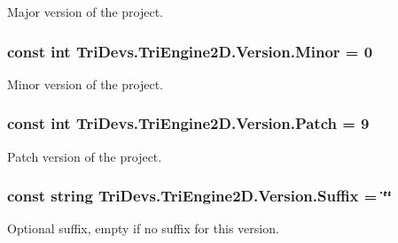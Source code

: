 Major version of the project. 

\hypertarget{class_tri_devs_1_1_tri_engine2_d_1_1_version_a46c99b37d8caad10a9702e9823f6cded}{
\subsubsection[{Minor}]{\setlength{\rightskip}{0pt plus 5cm}const int Tri\-Devs.\-Tri\-Engine2\-D.\-Version.\-Minor = 0}}\label{class_tri_devs_1_1_tri_engine2_d_1_1_version_a46c99b37d8caad10a9702e9823f6cded}


Minor version of the project. 

\hypertarget{class_tri_devs_1_1_tri_engine2_d_1_1_version_a5baa982b0404ea5ed3d2526e26f55809}{
\subsubsection[{Patch}]{\setlength{\rightskip}{0pt plus 5cm}const int Tri\-Devs.\-Tri\-Engine2\-D.\-Version.\-Patch = 9}}\label{class_tri_devs_1_1_tri_engine2_d_1_1_version_a5baa982b0404ea5ed3d2526e26f55809}


Patch version of the project. 

\hypertarget{class_tri_devs_1_1_tri_engine2_d_1_1_version_a5f7a61ae54163decac64e6acbe25e76d}{
\subsubsection[{Suffix}]{\setlength{\rightskip}{0pt plus 5cm}const string Tri\-Devs.\-Tri\-Engine2\-D.\-Version.\-Suffix = \char`\"{}\char`\"{}}}\label{class_tri_devs_1_1_tri_engine2_d_1_1_version_a5f7a61ae54163decac64e6acbe25e76d}


Optional suffix, empty if no suffix for this version. 

